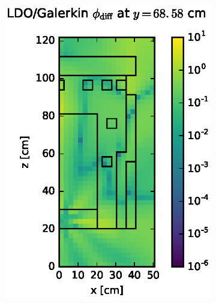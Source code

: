 \documentclass{article} %
\begin{document}
\begin{figure}[!hbt]
\begin{subfigure}{0.4\textwidth}
\includegraphics[max height=0.445\textheight]
{dlvn-flux-diff-gkn.eps}
\label{dlvn-fwd-diff-gkn}
\end{subfigure}
\\
\begin{subfigure}{0.4\textwidth}

\end{subfigure}
\end{figure}
\end{document}
